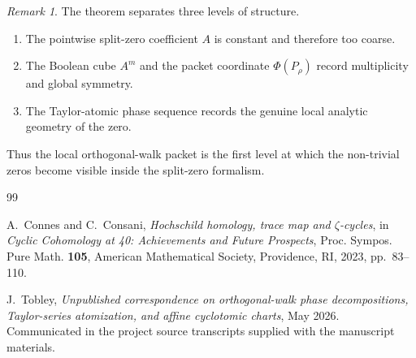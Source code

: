 \documentclass[11pt]{amsart}
\numberwithin{equation}{section}
\theoremstyle{definition}
\theoremstyle{remark}
\newtheorem{remark}[theorem]{Remark}
\begin{document}
\begin{remark}
The theorem separates three levels of structure.
\begin{enumerate}[label=(\arabic*)]
\item The pointwise split-zero coefficient $A$ is constant and therefore too coarse.
\item The Boolean cube $A^m$ and the packet coordinate $\Phi(P_\rho)$ record multiplicity and global symmetry.
\item The Taylor-atomic phase sequence records the genuine local analytic geometry of the zero.
\end{enumerate}
Thus the local orthogonal-walk packet is the first level at which the non-trivial zeros become visible inside the split-zero formalism.
\end{remark}

\begin{thebibliography}{99}

A.~Connes and C.~Consani,
\emph{Hochschild homology, trace map and $\zeta$-cycles},
in \emph{Cyclic Cohomology at 40: Achievements and Future Prospects},
Proc. Sympos. Pure Math. \textbf{105}, American Mathematical Society, Providence, RI, 2023, pp.~83--110.

J.~Tobley,
\emph{Unpublished correspondence on orthogonal-walk phase decompositions, Taylor-series atomization, and affine cyclotomic charts},
May 2026.  Communicated in the project source transcripts supplied with the manuscript materials.

\end{thebibliography}
\end{document}

